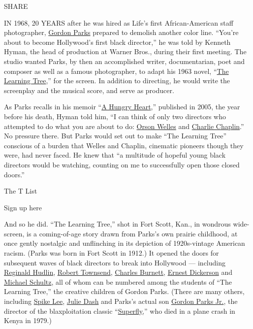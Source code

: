 SHARE

IN 1968, 20 YEARS after he was hired as Life's first African-American
staff photographer,
\href{https://www.nytimes.com/topic/person/gordon-parks}{Gordon Parks}
prepared to demolish another color line. ``You're about to become
Hollywood's first black director,'' he was told by Kenneth Hyman, the
head of production at Warner Bros., during their first meeting. The
studio wanted Parks, by then an accomplished writer, documentarian, poet
and composer as well as a famous photographer, to adapt his 1963 novel,
``\href{https://www.nytimes.com/watching/titles/the-learning-tree}{The
Learning Tree},'' for the screen. In addition to directing, he would
write the screenplay and the musical score, and serve as producer.

As Parks recalls in his memoir
``\href{https://www.simonandschuster.com/books/A-Hungry-Heart/Gordon-Parks/9780743269032}{A
Hungry Heart},'' published in 2005, the year before his death, Hyman
told him, ``I can think of only two directors who attempted to do what
you are about to do:
\href{https://www.nytimes.com/1985/10/11/arts/orson-welles-is-dead-at-70-innovator-of-film-and-stage.html}{Orson
Welles} and
\href{https://www.nytimes.com/topic/person/charles-chaplin}{Charlie
Chaplin}.'' No pressure there. But Parks would set out to make ``The
Learning Tree'' conscious of a burden that Welles and Chaplin, cinematic
pioneers though they were, had never faced. He knew that ``a multitude
of hopeful young black directors would be watching, counting on me to
successfully open those closed doors.''

The T List \textbar{}

Sign up here

And so he did. ``The Learning Tree,'' shot in Fort Scott, Kan., in
wondrous wide-screen, is a coming-of-age story drawn from Parks's own
prairie childhood, at once gently nostalgic and unflinching in its
depiction of 1920s-vintage American racism. (Parks was born in Fort
Scott in 1912.) It opened the doors for subsequent waves of black
directors to break into Hollywood --- including
\href{https://www.imdb.com/name/nm0399737/}{Reginald Hudlin},
\href{https://www.imdb.com/name/nm0870186/}{Robert Townsend},
\href{https://www.nytimes.com/2017/09/06/business/media/burnett-sutherland-honorary-oscars.html}{Charles
Burnett}, \href{https://www.imdb.com/name/nm0225416/}{Ernest Dickerson}
and \href{https://www.imdb.com/name/nm0776317/}{Michael Schultz}, all of
whom can be numbered among the students of ``The Learning Tree,'' the
creative children of Gordon Parks. (There are many others, including
\href{https://www.nytimes.com/topic/person/spike-lee}{Spike Lee},
\href{https://www.nytimes.com/interactive/2020/04/13/t-magazine/daughters-of-the-dust.html}{Julie
Dash} and Parks's actual son
\href{https://www.imdb.com/name/nm0662899/}{Gordon Parks Jr.}, the
director of the blaxploitation classic
``\href{https://www.nytimes.com/2018/06/18/watching/blaxpoitation-films-brown-sugar.html}{Superfly},''
who died in a plane crash in Kenya in 1979.)

